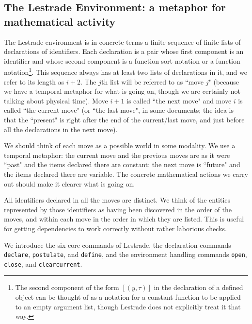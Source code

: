 \documentclass[12pt]{article}
\begin{document}
\subsection{The Lestrade Environment:  a metaphor for mathematical activity}

The Lestrade environment is in concrete terms a finite sequence of finite lists of declarations of identifiers.  Each declaration is a pair whose first component is  an identifier and whose second component is a function sort notation or a function notation\footnote{The second component of the form $[(y,\tau)]$ in the declaration of a defined object can be thought of as a notation for a constant function to be applied to an empty argument list, though Lestrade does not explicitly treat it that way.}.  This sequence always has at least two lists of declarations in it, and we refer to its length as $i+2$.  The $j$th list will be referred to as ``move $j$" (because we have a temporal metaphor for what is going on, though we are certainly not talking about physical time).  Move $i+1$ is called ``the next move" and move $i$ is called ``the current move" (or ``the last move", in some documents;  the idea is that the ``present" is right after the end of the current/last move, and just before all the declarations in the next move).

We should think of each move as a possible world in some modality.  We use a temporal metaphor:  the current move and the previous moves are as it were ``past" and the items declared there are constant:  the next move is ``future" and the items declared there are variable.  The concrete mathematical actions we carry out should make it clearer what is going on.

All identifiers declared in all the moves are distinct.  We think of the entities represented by those identifiers as having been discovered in the order of the moves, and within each move in the order in which they are listed.  This is useful for getting dependencies to work correctly without rather laborious checks.

We introduce the six core commands of Lestrade, the declaration commands {\tt declare}, {\tt postulate}, and {\tt define}, and the environment handling commands {\tt open}, {\tt close}, and {\tt clearcurrent}.
\end{document}
